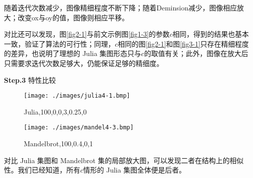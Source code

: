 随着迭代次数减少，图像精细程度不断下降；随着Deminsion减少，图像相应放大；改变ox与oy的值，图像则相应平移。

对比还可以发现，图\ref{fig2-1}与前文示例图\ref{fig1-3}的参数$c$相同，得到的结果也基本一致，验证了算法的可行性；同理，$c$相同的图\ref{fig2-1}和图\ref{fig3-1}只存在精细程度的差异，也说明了理想的 Julia 集图形态只与$c$的取值有关；此外，图像在放大后只需要求迭代次数足够大，仍能保证足够的精细度。

\textbf{Step.3} 特性比较

\begin{figure}[htb]
\centering
\begin{minipage}{0.45\linewidth}
\centering
\texttt{[image: ./images/julia4-1.bmp]}
\caption{Julia,100,0,0,3,0.25,0}
\label{fig4-1}
\end{minipage}\hfill
\begin{minipage}{0.45\linewidth}
\centering
\texttt{[image: ./images/mandel4-3.bmp]}
\caption{Mandelbrot,100,0.4,0,1}
\label{fig4-2}
\end{minipage}
\end{figure}

对比 Julia 集图和 Mandelbrot 集的局部放大图，可以发现二者在结构上的相似性。我们已经知道，所有$c$情形的 Julia 集图全体便是后者。
